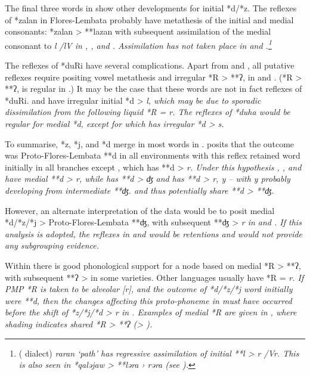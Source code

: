 The final three words in  show other
developments for initial *d/*z.
The reflexes of *zalan in Flores-Lembata probably have metathesis
of the initial and medial consonants: *zalan > **lazan with subsequent assimilation
of the medial consonant to \it{l} /lV{\gap} in ,
, and .
Assimilation has not taken place in 
and .\footnote{ 
		 ( dialect) \it{raran} ‘path’ has regressive
		assimilation of initial **l > \it{r} /{\gap}Vr.
		This is also seen in *qaləjaw > **ləra › \it{rəra} (see ).}

The reflexes of *duRi have several complications.
Apart from  and , all putative reflexes require positing
vowel metathesis and irregular *R > **ʔ,
{\0} in  and .
(*R > **ʔ, {\0} is regular in .) It may be
the case that these words are not in fact reflexes of *duRi.
 and  have irregular initial *d > \it{l},
which may be due to sporadic dissimilation from the following
liquid *R = \it{r}.
The reflexes of *duha would be regular for medial *d,
except for  which has irregular *d > \it{s}.

To summarise, *z, *j, and *d merge in most words in .
\citet{Fricke2019} posits that the outcome was Proto-Flores-Lembata
**d in all environments with this reflex retained word initially
in all branches except ,
which has **d > \it{r}.
Under this hypothesis ,
, and  have medial **d
> \it{r}, while  has **d > \it{ʤ}
and  has **d > \it{r,
y} -- with \it{y} probably developing from intermediate **ʤ.
 and  thus potentially share **d > **ʤ.

\largerpage
However, an alternate interpretation of the data would be to
posit medial *d/*z/*j > Proto-Flores-Lembata **ʤ,
with subsequent **ʤ > \it{r} in  and .
If this analysis is adopted,
the reflexes in 
and  would be retentions
and would not provide any subgrouping evidence.

Within  there is good phonological support
for a  node based on medial *R > **ʔ,
with subsequent **ʔ > {\0} in some varieties.
Other  languages usually have *R = \it{r}.
If PMP *R is taken to be alveolar [r],
and the outcome of *d/*z/*j word initially were **d,
then the changes affecting this proto-phoneme in 
must have occurred before the shift of *z/*j/*d > \it{r} in .
Examples of medial *R are given in ,
where shading indicates shared *R > **ʔ (> {\0}).

